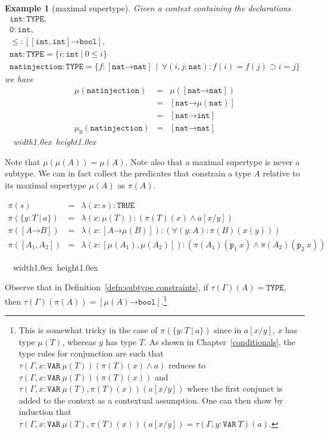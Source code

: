 \documentclass [12pt,twoside]{cslreport}
\newcommand{\thmbox}
   {{\ \hfill\hbox{%
      \vrule width1.0ex height1.0ex
   }\parfillskip 0pt }}
\newtheorem{example}[thm]{Example}
\newcommand{\aro}{\mathord\rightarrow} %
\newcommand{\funtype}[2]{[#1 \aro #2]}
\newcommand{\tupletype}[1]{[#1]}
\newcommand{\tauGamma}[1]{\tau(\Gamma)(#1)}
\newcommand{\proj}[1]{\mathtt{p}_{#1}}
\newcommand{\listwo}[2]{#1_{1}, #1_{2}}
\newcommand{\ttbool}{\mathtt{bool}}
\newcommand{\tttrue}{\mathtt{TRUE}}
\newcommand{\tttype}{\mathtt{TYPE}}
\newcommand{\ttvar}{\mathtt{VAR}}
\newcommand{\ttint}{\mathtt{int}}
\newcommand{\ttnat}{\mathtt{nat}}
\newcommand{\vbar}{\ |\ }
\newenvironment{Eg}[1]{\begin{example}[#1]\label{eg:#1}\em }{\thmbox\end{example}}
\newenvironment{Defn}[1]{\begin{definition}[#1]\label{defn:#1}}{
\thmbox\end{definition}}
\begin{document}
\begin{Eg}{maximal supertype}
Given a context containing the declarations
$$\begin{array}{l}
  \ttint : \tttype, \\
  \mathtt{0} : \ttint,\\
  \leq : \funtype{\tupletype{\ttint, \ttint}}{\ttbool},\\
  \ttnat : \tttype = \{ i : \ttint \vbar  0 \leq i\}\\
  \mathtt{natinjection} : \tttype = \{ f : \funtype{\ttnat}{\ttnat}\ \vbar\ 
\forall (i, j: \ttnat): f(i) = f(j) \supset i = j \}
\end{array}$$
we have
\begin{eqnarray*}
  \mu(\mathtt{natinjection}) & = & \mu(\funtype{\ttnat}{\ttnat})\\
 &=  & \funtype{\ttnat}{\mu(\ttnat)}\\
 &=  & \funtype{\ttnat}{\ttint}\\
\mu_0(\mathtt{natinjection}) & = & \funtype{\ttnat}{\ttnat}
\end{eqnarray*}
\end{Eg}

Note that   $\mu(\mu(A)) = \mu(A)$.
Note also that a maximal supertype is never a subtype.  
We can in fact collect the predicates that constrain a type $A$
relative to its maximal supertype $\mu(A)$ as $\pi(A)$\@.

\begin{Defn}{subtype constraints}
\begin{eqnarray*}
  \pi(s) & = & \lambda (x : s): \tttrue \\
   \pi(\{y : T \vbar a\}) & = &   \lambda (x : \mu(T)): (\pi(T)(x) \wedge a[x/y])\\
%
   \pi(\funtype{A}{B}) & = &   \lambda (x : \funtype{A}{\mu(B)}):
    (\forall (y: A): \pi(B)(x(y))) \\
%
\pi(\tupletype{\listwo{A}{n}}) & = &
    \lambda (x: \tupletype{\mu(A_1),  \mu(A_2)}): 
	(\pi(A_1)(\proj{1}~x)\wedge \pi(A_2)(\proj{2}~x))
\end{eqnarray*}
\end{Defn}
Observe that in Definition~\ref{defn:subtype constraints}, if $\tauGamma{A} =
\tttype$, then 
$\tauGamma{\pi(A)} = \funtype{\mu(A)}{
 \mathtt{bool}}$\@.\footnote{This is somewhat tricky in the case of
$\pi(\{y:T\vbar a\})$ since in $a[x/y]$, $x$ has type $\mu(T)$, whereas
$y$ has type $T$\@.  As shown in Chapter~\ref{conditionals}, the
type rules for conjunction are such that $\tau(\Gamma, x :
\ttvar~\mu(T))(\pi(T)(x) \wedge a)$ reduces to
$\tau(\Gamma, x : \ttvar~\mu(T))(\pi(T)(x))$ and
$\tau(\Gamma, x : \ttvar~\mu(T), \pi(T)(x))(a[x/y])$ where the first
conjunct is added to the context as a contextual assumption.
One can then show by induction that $\tau(\Gamma, x:\ttvar~\mu(T),
\pi(T)(x))(a[x/y]) = \tau(\Gamma, y: \ttvar~T)(a)$\@.  }
\end{document}
